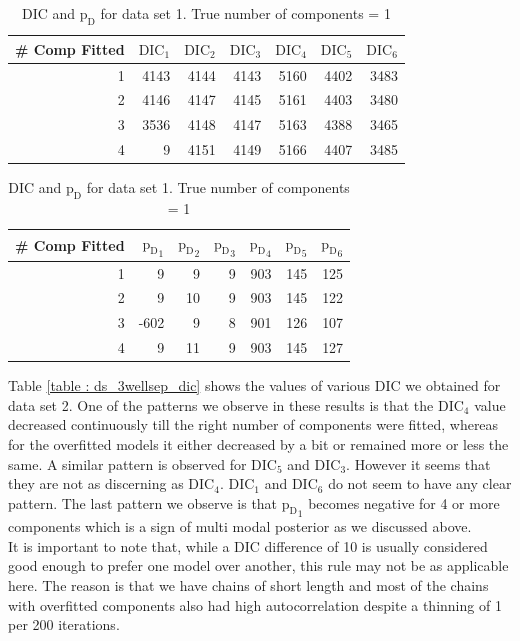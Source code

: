 \begin{table}[!htb]
\centering
\caption{DIC and $\text{p}_\text{D}$ for data set 1. True number of components = 1}
\label{table : ds_simple_dic} 
\begin{tabular}{@{}rrrrrrr@{}}
\toprule
\# Comp Fitted & $\text{DIC}_1$ & $\text{DIC}_2$  & $\text{DIC}_3$  & $\text{DIC}_4$  & $\text{DIC}_5$  & $\text{DIC}_6$  \\ \midrule
1      & 4143 & 4144 & 4143 & 5160 & 4402 & 3483 \\
2      & 4146 & 4147 & 4145 & 5161 & 4403 & 3480 \\
3      & 3536 & 4148 & 4147 & 5163 & 4388 & 3465 \\
4      & 9    & 4151 & 4149 & 5166 & 4407 & 3485 \\ \bottomrule
\end{tabular}

\begin{tabular}{@{}rrrrrrr@{}}
\toprule
\# Comp Fitted & ${\text{p}_\text{D}}_1$ & ${\text{p}_\text{D}}_2$ & ${\text{p}_\text{D}}_3$ & ${\text{p}_\text{D}}_4$ & ${\text{p}_\text{D}}_5$ & ${\text{p}_\text{D}}_6$ \\ \midrule
1      & 9    & 9    & 9    & 903  & 145  & 125  \\
2      & 9    & 10   & 9    & 903  & 145  & 122  \\
3      & -602 & 9    & 8    & 901  & 126  & 107  \\
4      & 9    & 11   & 9    & 903  & 145  & 127  \\ \bottomrule
\end{tabular}
\end{table}

Table \ref{table : ds_3wellsep_dic} shows the values of various DIC we obtained for data set 2. One of the patterns we observe in these results is that the $\text{DIC}_4$ value decreased continuously till the right number of components were fitted, whereas for the overfitted models it either decreased by a bit or remained more or less the same. A similar pattern is observed for $\text{DIC}_5$ and $\text{DIC}_3$. However it seems that they are not as discerning as $\text{DIC}_4$. $\text{DIC}_1$ and $\text{DIC}_6$ do not seem to have any clear pattern. The last pattern we observe is that ${\text{p}_\text{D}}_1$ becomes negative for 4 or more components which is a sign of multi modal posterior as we discussed above.\\

It is important to note that, while a DIC difference of 10 is usually considered good enough to prefer one model over another, this rule may not be as applicable here. The reason is that we have chains of short length and most of the chains with overfitted components also had high autocorrelation despite a thinning of 1 per 200 iterations.\\

